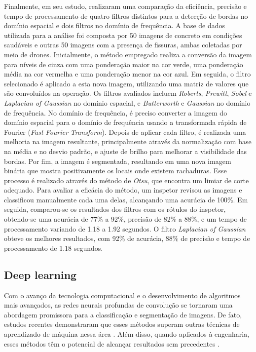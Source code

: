 Finalmente, em seu estudo,  realizaram uma comparação da eficiência, precisão e tempo de processamento de quatro filtros distintos para a detecção de bordas no domínio espacial e dois filtros no domínio de frequência. 
A base de dados utilizada para a análise foi composta por 50 imagens de concreto em condições saudáveis e outras 50 imagens com a presença de fissuras, ambas coletadas por meio de drones.
Inicialmente, o método empregado realiza a conversão da imagem para níveis de cinza com uma ponderação maior na cor verde, uma ponderação média na cor vermelha e uma ponderação menor na cor azul. 
Em seguida, o filtro selecionado é aplicado a esta nova imagem, utilizando uma matriz de valores que são convoluídos na operação. 
Os filtros avaliados incluem \textit{Roberts}, \textit{Prewitt}, \textit{Sobel} e \textit{Laplacian of Gaussian} no domínio espacial, e \textit{Butterworth} e \textit{Gaussian} no domínio de frequência.
No domínio de frequência, é preciso converter a imagem do domínio espacial para o domínio de frequência usando a transformada rápida de Fourier (\textit{Fast Fourier Transform}). 
Depois de aplicar cada filtro, é realizada uma melhoria na imagem resultante, principalmente através da normalização com base na média e no desvio padrão, e ajuste de brilho para melhorar a visibilidade das bordas.
Por fim, a imagem é segmentada, resultando em uma nova imagem binária que mostra positivamente os locais onde existem rachaduras. 
Esse processo é realizado através do método de \textit{Otsu}, que encontra um limiar de corte adequado.
Para avaliar a eficácia do método, um inspetor revisou as imagens e classificou manualmente cada uma delas, alcançando uma acurácia de 100\%.
Em seguida, comparou-se os resultados dos filtros com os rótulos do inspetor, obtendo-se uma acurácia de 77\% a 92\%, precisão de 82\% a 88\%, e um tempo de processamento variando de 1.18 a 1.92 segundos. 
O filtro \textit{Laplacian of Gaussian} obteve os melhores resultados, com 92\% de acurácia, 88\% de precisão e tempo de processamento de 1.18 segundos.

\subsection{Deep learning}

Com o avanço da tecnologia computacional e o desenvolvimento de algoritmos mais avançados, as redes neurais profundas de convolução se tornaram uma abordagem promissora para a classificação e segmentação de imagens. 
De fato, estudos recentes demonstraram que esses métodos superam outras técnicas de aprendizado de máquina nessa área \cite{zhou2020concrete}. 
Além disso, quando aplicados à engenharia, esses métodos têm o potencial de alcançar resultados sem precedentes \cite{qiao2021computer}.

